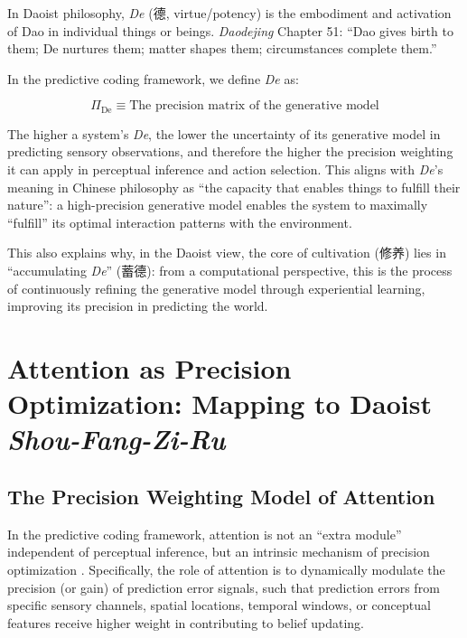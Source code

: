 \documentclass[11pt,a4paper]{article}
\begin{document}
In Daoist philosophy, \textit{De} (德, virtue/potency) is the embodiment and activation of Dao in individual things or beings. \textit{Daodejing} Chapter 51: ``Dao gives birth to them; De nurtures them; matter shapes them; circumstances complete them.''

In the predictive coding framework, we define \textit{De} as:

\begin{equation}
\Pi_{\text{De}} \equiv \text{The precision matrix of the generative model}
\label{eq:de}
\end{equation}

The higher a system's \textit{De}, the lower the uncertainty of its generative model in predicting sensory observations, and therefore the higher the precision weighting it can apply in perceptual inference and action selection. This aligns with \textit{De}'s meaning in Chinese philosophy as ``the capacity that enables things to fulfill their nature'': a high-precision generative model enables the system to maximally ``fulfill'' its optimal interaction patterns with the environment.

This also explains why, in the Daoist view, the core of cultivation (修养) lies in ``accumulating \textit{De}'' (蓄德): from a computational perspective, this is the process of continuously refining the generative model through experiential learning, improving its precision in predicting the world.

\section{Attention as Precision Optimization: Mapping to Daoist \textit{Shou-Fang-Zi-Ru}}

\subsection{The Precision Weighting Model of Attention}

In the predictive coding framework, attention is not an ``extra module'' independent of perceptual inference, but an intrinsic mechanism of precision optimization \cite{Feldman2010,Parr2019}. Specifically, the role of attention is to dynamically modulate the precision (or gain) of prediction error signals, such that prediction errors from specific sensory channels, spatial locations, temporal windows, or conceptual features receive higher weight in contributing to belief updating.
\end{document}
